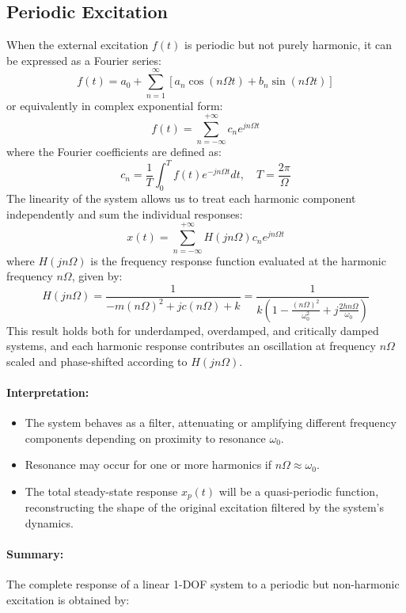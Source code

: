 \subsection{Periodic Excitation}

When the external excitation \( f(t) \) is periodic but not purely harmonic, it can be expressed as a Fourier series:
\[
f(t) = a_0 + \sum_{n=1}^{\infty} \left[ a_n \cos(n \Omega t) + b_n \sin(n \Omega t) \right]
\]
or equivalently in complex exponential form:
\[
f(t) = \sum_{n=-\infty}^{+\infty} c_n e^{j n \Omega t}
\]
where the Fourier coefficients are defined as:
\[
c_n = \frac{1}{T} \int_0^T f(t) e^{-j n \Omega t}  dt, \quad T = \frac{2\pi}{\Omega}
\]
The linearity of the system allows us to treat each harmonic component independently and sum the individual responses:
\[
x(t) = \sum_{n=-\infty}^{+\infty} H(j n \Omega) c_n e^{j n \Omega t}
\]
where \( H(j n \Omega) \) is the frequency response function evaluated at the harmonic frequency \( n \Omega \), given by:
\[
H(j n \Omega) = \frac{1}{-m (n \Omega)^2 + j c (n \Omega) + k}
= \frac{1}{k \left( 1 - \frac{(n \Omega)^2}{\omega_0^2} + j \frac{2 h n \Omega}{\omega_0} \right)}
\]
This result holds both for underdamped, overdamped, and critically damped systems, and each harmonic response contributes an oscillation at frequency \( n \Omega \) scaled and phase-shifted according to \( H(j n \Omega) \).

\paragraph{Interpretation:}

\begin{itemize}
    \item The system behaves as a filter, attenuating or amplifying different frequency components depending on proximity to resonance \( \omega_0 \).
    \item Resonance may occur for one or more harmonics if \( n \Omega \approx \omega_0 \).
    \item The total steady-state response \( x_p(t) \) will be a quasi-periodic function, reconstructing the shape of the original excitation filtered by the system's dynamics.
\end{itemize}

\paragraph{Summary:} The complete response of a linear 1-DOF system to a periodic but non-harmonic excitation is obtained by:

